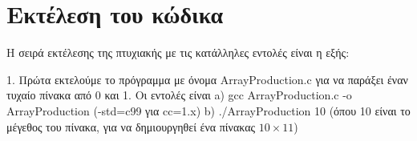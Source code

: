 \section{Εκτέλεση του κώδικα}
Η σειρά εκτέλεσης της πτυχιακής με τις κατάλληλες εντολές είναι η εξής:

1. Πρώτα εκτελούμε το πρόγραμμα με όνομα {\lt ArrayProduction.c} για να παράξει έναν τυχαίο πίνακα από 0 και 1. Οι εντολές είναι
a) gcc ArrayProduction.c -o ArrayProduction (-std=c99 για cc=1.x)
b) ./ArrayProduction 10 (όπου 10 είναι το μέγεθος του πίνακα, για να δημιουργηθεί ένα πίνακας $10 \times 11$)
